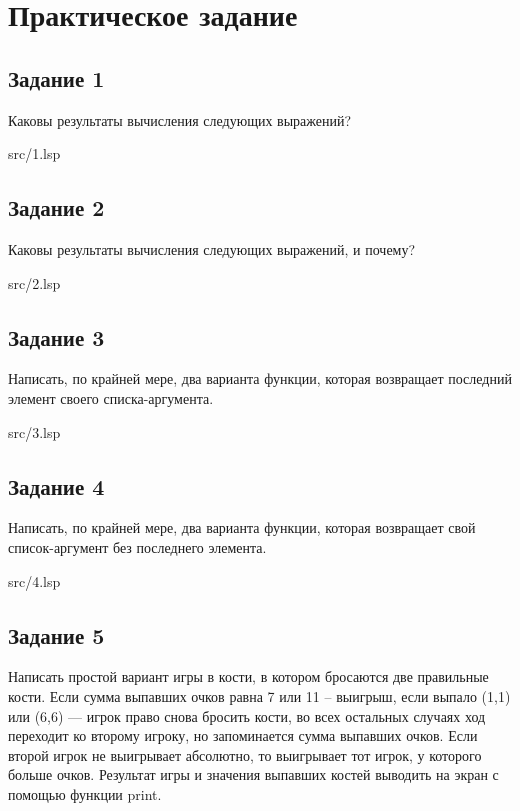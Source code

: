 \chapter*{Практическое задание}

\section*{Задание 1}
Каковы результаты вычисления следующих выражений?

\FloatBarrier
\begin{lstinputlisting}[style={lsp}]{src/1.lsp}
\end{lstinputlisting}
\FloatBarrier

\section*{Задание 2}
Каковы результаты вычисления следующих выражений, и почему?

\FloatBarrier
\begin{lstinputlisting}[style={lsp}]{src/2.lsp}
\end{lstinputlisting}
\FloatBarrier

\section*{Задание 3}
Написать, по крайней мере, два варианта функции, которая возвращает последний элемент
своего списка-аргумента.

\FloatBarrier
\begin{lstinputlisting}[style={lsp}]{src/3.lsp}
\end{lstinputlisting}
\FloatBarrier

\clearpage

\section*{Задание 4}
Написать, по крайней мере, два варианта функции, которая возвращает свой список-аргумент без последнего элемента.

\FloatBarrier
\begin{lstinputlisting}[style={lsp}]{src/4.lsp}
\end{lstinputlisting}
\FloatBarrier

\section*{Задание 5}
Написать простой вариант игры в кости, в котором бросаются две правильные кости. Если
сумма выпавших очков равна 7 или 11 -- выигрыш, если выпало (1,1) или (6,6) --- игрок право
снова бросить кости, во всех остальных случаях ход переходит ко второму игроку, но
запоминается сумма выпавших очков. Если второй игрок не выигрывает абсолютно, то
выигрывает тот игрок, у которого больше очков. Результат игры и значения выпавших костей
выводить на экран с помощью функции print.

